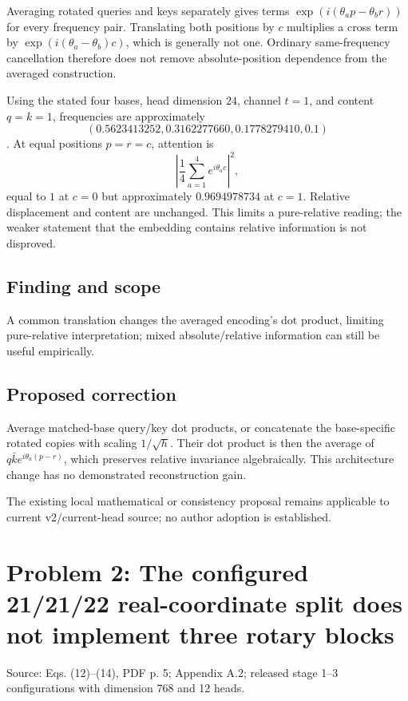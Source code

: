 \documentclass[11pt]{article}
\begin{document}
Averaging rotated queries and keys separately gives terms \(\exp(i(\theta_a p-\theta_b r))\) for every frequency pair. Translating both positions by \(c\) multiplies a cross term by \(\exp(i(\theta_a-\theta_b)c)\), which is generally not one. Ordinary same-frequency cancellation therefore does not remove absolute-position dependence from the averaged construction.

Using the stated four bases, head dimension \(24\), channel \(t=1\), and content \(q=k=1\), frequencies are approximately \[(0.5623413252,0.3162277660,0.1778279410,0.1)\]. At equal positions \(p=r=c\), attention is \[\left|\frac14\sum_{a=1}^4e^{i\theta_ac}\right|^2,\] equal to \(1\) at \(c=0\) but approximately \(0.9694978734\) at \(c=1\). Relative displacement and content are unchanged. This limits a pure-relative reading; the weaker statement that the embedding contains relative information is not disproved.

\subsection*{Finding and scope}

A common translation changes the averaged encoding’s dot product, limiting pure-relative interpretation; mixed absolute/relative information can still be useful empirically.

\subsection*{Proposed correction}

Average matched-base query/key dot products, or concatenate the base-specific rotated copies with scaling \(1/\sqrt h\). Their dot product is then the average of \(q\bar k e^{i\theta_a(p-r)}\), which preserves relative invariance algebraically. This architecture change has no demonstrated reconstruction gain.

The existing local mathematical or consistency proposal remains applicable to current v2/current-head source; no author adoption is established.

\section*{Problem 2: The configured 21/21/22 real-coordinate split does not implement three rotary blocks}

Source: Eqs. (12)–(14), PDF p. 5; Appendix A.2; released stage 1–3 configurations with dimension 768 and 12 heads.
\end{document}
